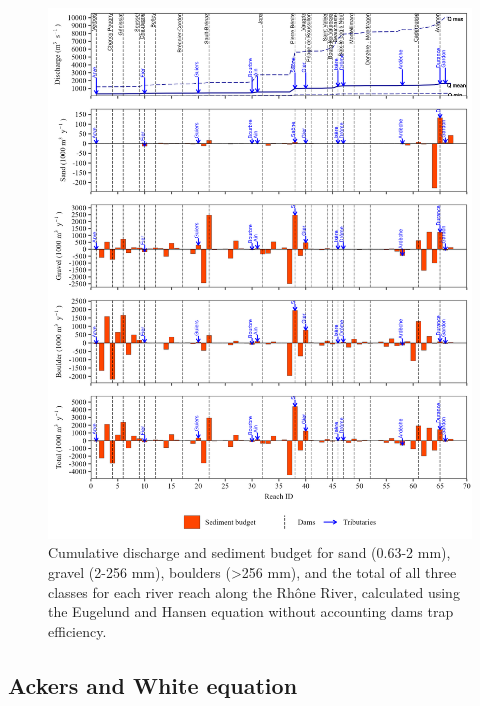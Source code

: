 \documentclass[
]{book}
\begin{document}
\begin{figure}
\includegraphics[width=26.24in]{img/res_cascade/res_E0_eE&H_noDams/plots_sed_budget-silt/sed_bud_res_sum_hy_E0_eE&H_noDams} \caption{Cumulative discharge and sediment budget for sand (0.63-2 mm), gravel (2-256 mm), boulders (>256 mm), and the total of all three classes for each river reach along the Rhône River, calculated using the Eugelund and Hansen equation without accounting dams trap efficiency.}\label{fig:budgetE0eE}
\end{figure}

\subsection{Ackers and White equation}\label{ackers-and-white-equation}
\end{document}
